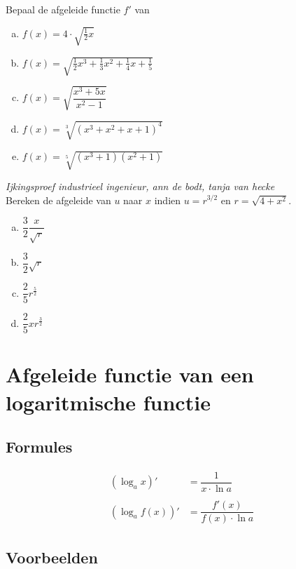 \documentclass[12pt,twoside,a4paper]{article}
\begin{document}
\begin{oefening}
Bepaal de afgeleide functie $f'$ van\\
\begin{enumerate}[(a)]
  \itemsep0.5em
  \item $\displaystyle f(x)=4\cdot\sqrt{\frac{1}{2}x}$
  \item $\displaystyle f(x)=\sqrt{\frac{1}{2}x^3+\frac{1}{3}x^2+\frac{1}{4}x+\frac{1}{5}}$
  \item $\displaystyle f(x)=\sqrt{\dfrac{x^3+5x}{x^2-1}}$
  \item $\displaystyle f(x)=\sqrt[3]{\left(x^3+x^2+x+1\right)^4}$
  \item $\displaystyle f(x)=\sqrt[5]{\left(x^3+1\right)\left(x^2+1\right)}$
\end{enumerate}
\end{oefening}

\begin{oefening}
{\em \scriptsize Ijkingsproef industrieel ingenieur, ann de bodt, tanja van hecke}\\
Bereken de afgeleide van $u$ naar $x$ indien $u=r^{3/2}$ en $r=\sqrt{4+x^2}$.
\begin{enumerate}[(a)]
  \itemsep.3em
  \item $\dfrac{3}{2}\dfrac{x}{\sqrt{r}}$
  \item $\dfrac{3}{2}\sqrt{r}$
  \item $\dfrac{2}{5}r^\frac{5}{2}$
  \item $\dfrac{2}{5}xr^\frac{3}{2}$
\end{enumerate}
\end{oefening}

\cleardoublepage
\section{Afgeleide functie van een logaritmische functie}

\subsection{Formules}

\begin{align*}
  (\log_a x)'    & = \dfrac{1}{x\cdot \ln a} \\\\
  (\log_a f(x))' & = \dfrac{f'(x)}{f(x) \cdot \ln a}
\end{align*}

\subsection{Voorbeelden}
\end{document}
